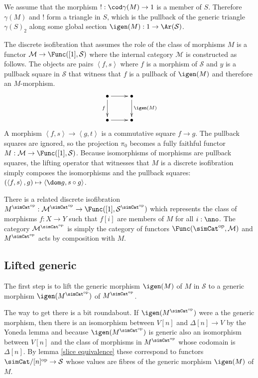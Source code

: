\documentclass{tac}
\newcommand\hide[1]{}
\newcommand\cat\mathcal
\newcommand\dual{^{\mathrm{op}}}
\newcommand\s{^{\simCat\dual}}
\newcommand\bang{!}
\newcommand\of{:}
\newcommand\simplex\Delta
\newcommand\gen\gamma
\newcommand\tuplet[1]{\left\langle #1 \right\rangle}
\begin{document}
We assume that the morphism $\bang\of\cod\gen(M)\to 1$ is a member of $S$. Therefore $\gen(M)$ and $\bang$ form a triangle in $S$, which is the pullback of the generic triangle $\gen(S)_2$ along some global section $\igen(M)\of 1\to \Ar(\cat S)$.

The discrete isofibration that assumes the role of the class of morphisms $M$ is a functor $\cat M\to \Func([1],\cat S)$ where the internal category $\cat M$ is constructed as follows. The objects are pairs $\tuplet{f,s}$ where $f$ is a morphism of $\cat S$ and $y$ is a pullback square in $\cat S$ that witness that $f$ is a pullback of $\igen(M)$ and therefore an $M$-morphism.
\[\xymatrix{
\bullet\ar[d]_f\ar[r] & \bullet\ar[d]^{\igen(M)}\\
\bullet\ar[r] & \bullet
}\]
A morphism $\tuplet{f,s}\to \tuplet{g,t}$ is a commutative square $f\to g$. The pullback squares are ignored, so the projection $\pi_0$ becomes a fully faithful functor $M\of\cat M\to \Func([1],\cat S)$. Because isomorphisms of morphisms are pullback squares, the lifting operator that witnesses that $M$ is a discrete isofibration simply composes the isomorphisms and the pullback squares: $(\tuplet{f,s},g)\mapsto \tuplet {\dom g,s\circ g}$.

There is a related discrete isofibration $M\s\of \cat M\s\to \Func([1],\cat S\s)$ which represents the class of morphisms $f\of X\to Y$ such that $f[i]$ are members of $M$ for all $i\of \nno$. The category $\cat M\s$ is simply the category of functors $\Func(\simCat\dual,\cat M)$ and $M\s$ acts by composition with $M$.

\hide{ Is dit genoeg? }


\subsection{Lifted generic}
The first step is to lift the generic morphism $\igen(M)$ of $M$ in $\cat S$ to a generic morphism $\igen(M\s)$ of $M\s$.

The way to get there is a bit roundabout. If $\igen(M\s)$ were a the generic morphism, then there is an isomorphism between $V[n]$ and $\simplex[n]\to V$ by the Yoneda lemma and because $\igen(M\s)$ is generic also an isomorphism between $V[n]$ and the class of morphisms in $M\s$ whose codomain is $\simplex[n]$. By lemma \ref{slice equivalence} these correspond to functors $\simCat/[n]\dual\to\cat S$ whose values are fibres of the generic morphism $\igen(M)$ of $M$. 
\end{document}
